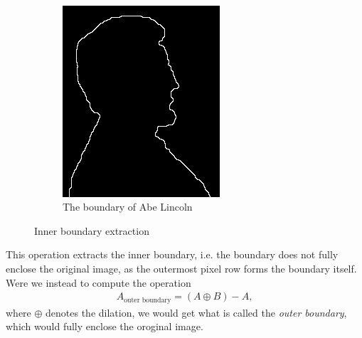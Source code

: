 \documentclass[]{article}
\begin{document}
\begin{figure}[H]
\begin{subfigure}{0.5\textwidth}
    \end{subfigure}%
    ~
    \begin{subfigure}{0.5\textwidth}
        \centering
        \includegraphics[width=\textwidth]{img/lincoln-boundary}
        \caption{The boundary of Abe Lincoln}
        \label{fig:abe_after}
    \end{subfigure}%
    \caption{Inner boundary extraction}
    \label{fig:my_boy_abe}
\end{figure}
This operation extracts the inner boundary, i.e. the boundary does not fully enclose the original image, as the outermost pixel row forms the boundary itself. Were we instead to compute the operation
\begin{equation}\begin{aligned}
A_{\text{outer boundary}} = (A \oplus B) - A,
\end{aligned}\end{equation}
where $\oplus$ denotes the dilation, we would get what is called the \textit{outer boundary}, which would fully enclose the oroginal image.
\end{document}
